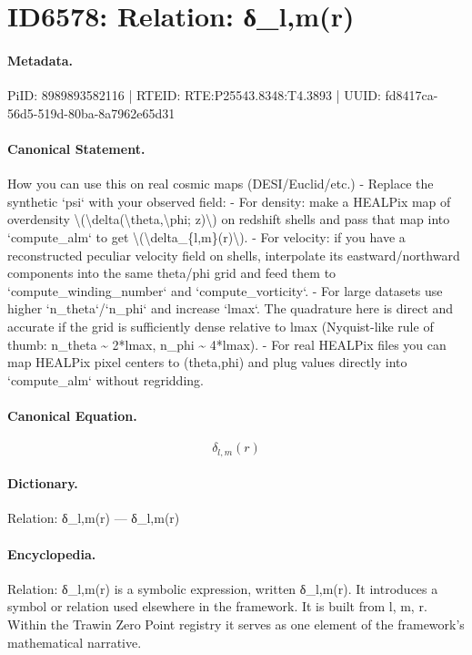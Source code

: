 \section*{ID6578: Relation: δ\_l,m(r)}
\paragraph{Metadata.}
PiID: 8989893582116 | RTEID: RTE:P25543.8348:T4.3893 | UUID: fd8417ca-56d5-519d-80ba-8a7962e65d31

\paragraph{Canonical Statement.}
How you can use this on real cosmic maps (DESI/Euclid/etc.) - Replace the synthetic `psi` with your observed field: - For density: make a HEALPix map of overdensity \textbackslash{}(\textbackslash{}delta(\textbackslash{}theta,\textbackslash{}phi; z)\textbackslash{}) on redshift shells and pass that map into `compute\_alm` to get \textbackslash{}(\textbackslash{}delta\_\{l,m\}(r)\textbackslash{}). - For velocity: if you have a reconstructed peculiar velocity field on shells, interpolate its eastward/northward components into the same theta/phi grid and feed them to `compute\_winding\_number` and `compute\_vorticity`. - For large datasets use higher `n\_theta`/`n\_phi` and increase `lmax`. The quadrature here is direct and accurate if the grid is sufficiently dense relative to lmax (Nyquist-like rule of thumb: n\_theta \textasciitilde{} 2*lmax, n\_phi \textasciitilde{} 4*lmax). - For real HEALPix files you can map HEALPix pixel centers to (theta,phi) and plug values directly into `compute\_alm` without regridding.

\paragraph{Canonical Equation.}
\[
\delta_{l,m}(r)
\]

\paragraph{Dictionary.}
Relation: δ\_l,m(r) — δ\_l,m(r)

\paragraph{Encyclopedia.}
Relation: δ\_l,m(r) is a symbolic expression, written δ\_l,m(r). It introduces a symbol or relation used elsewhere in the framework. It is built from l, m, r. Within the Trawin Zero Point registry it serves as one element of the framework's mathematical narrative.
